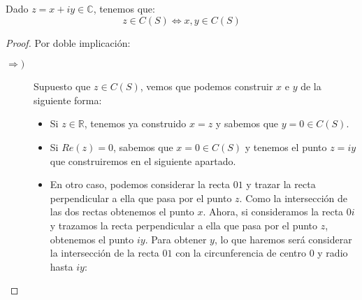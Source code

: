 \begin{lema}\label{lema:real_im}
    Dado $z=x+iy\in \mathbb{C}$, tenemos que:
    \begin{equation*}
        z\in C(S) \Longleftrightarrow x,y\in C(S)
    \end{equation*}
    \begin{proof}
        Por doble implicación:
        \begin{description}
            \item [$\Longrightarrow )$] Supuesto que $z\in C(S)$, vemos que podemos construir $x$ e $y$ de la siguiente forma:
                \begin{itemize}
                    \item Si $z\in \mathbb{R}$, tenemos ya construido $x=z$ y sabemos que $y=0\in C(S)$.
                    \item Si $Re(z) = 0$, sabemos que $x=0\in C(S)$ y tenemos el punto $z=iy$ que construiremos en el siguiente apartado.
                    \item En otro caso, podemos considerar la recta $01$ y trazar la recta perpendicular a ella que pasa por el punto $z$. Como la intersección de las dos rectas obtenemos el punto $x$. Ahora, si consideramos la recta $0i$ y trazamos la recta perpendicular a ella que pasa por el punto $z$, obtenemos el punto $iy$. Para obtener $y$, lo que haremos será considerar la intersección de la recta $01$ con la circunferencia de centro $0$ y radio hasta $iy$:
                        \begin{figure}[H]
                            \centering

\end{figure}
\end{itemize}
\end{description}
\end{proof}
\end{lema}
